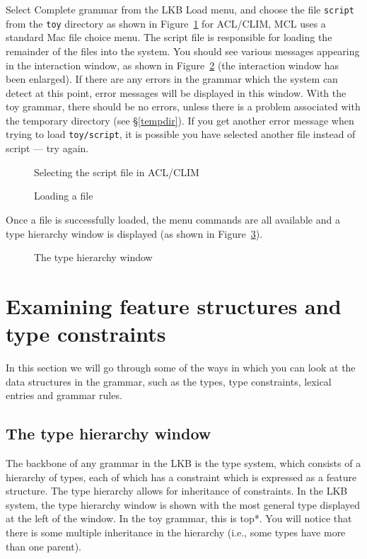 \documentclass[12pt]{report}
\newcommand{\filename}[1]{{\tt #1}}
\newcommand{\lkbmenucommand}{{\bf}}
\begin{document}
Select {\lkbmenucommand Complete grammar} from the LKB {\lkbmenucommand Load}
menu, and choose the file \filename{script} from the \filename{toy} directory
as shown in Figure~\ref{loadscript} for ACL/CLIM, MCL uses a standard
Mac file choice menu.
The script file is responsible for
loading the remainder of the files into the system.  You should see various
messages appearing in the interaction window, as shown in
Figure~\ref{loadmess}
(the interaction window has been enlarged).  
If there are any errors in the grammar which the system
can detect at this point, error messages will be displayed in this window.
With the toy grammar, there should be no errors, unless there is a problem 
associated with the temporary directory (see \S\ref{tempdir}).
If
you get another error message when trying to load 
\filename{toy/script}, it is
possible you have selected another file instead of script --- try again.
\begin{figure}
\epsfxsize=3in
\caption{Selecting the script file in ACL/CLIM}
\label{loadscript}
\end{figure}
\begin{figure}
\caption{Loading a file}
\label{loadmess}
\end{figure}

Once a file is successfully loaded, the menu commands are all available
and a type hierarchy window is displayed (as shown in Figure~\ref{typehier}).
\begin{figure}
\epsfxsize=3in
\caption{The type hierarchy window}
\label{typehier}
\end{figure}


\section{Examining feature structures and type constraints}

In this section we will go through some of the ways in which
you can look at the data structures in the grammar, such as the types,
type constraints,
lexical entries and grammar rules.

\subsection{The type hierarchy window}
The backbone of any grammar in the LKB is the type system,
which consists of a hierarchy of types, each of which has a
constraint which is expressed as a feature structure.
The type hierarchy allows for inheritance of constraints.
In the LKB system, the type hierarchy window is shown 
with the most
general type displayed at the left of the window.  In the toy grammar, 
this is {\type *top*}.  
You will notice that there is some multiple inheritance in the hierarchy
(i.e., some types have more than one parent).
\end{document}

